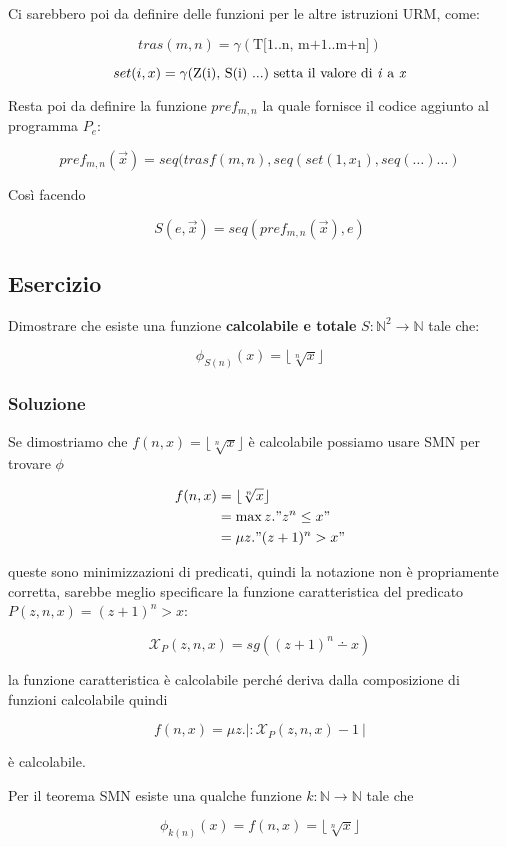 Ci sarebbero poi da definire delle funzioni per le altre istruzioni URM, come:

$$
tras(m,n) = \gamma(\text{T[1..n, m+1..m+n]})
$$

$$
set(i,x) = \gamma(\text{Z(i), S(i) ...}) \text{ setta il valore di \textit{i} a \textit{x}}
$$

Resta poi da definire la funzione $ pref_{m,n} $ la quale fornisce il codice aggiunto al programma $ P_e $:

$$
pref_{m,n}(\vec{x}) = seq(trasf(m,n), seq( set(1,x_1), seq( \ldots) \ldots )
$$

Così facendo

$$
S(e, \vec{x}) = seq(pref_{m,n}(\vec{x}) ,e )
$$

\subsection{Esercizio}

Dimostrare che esiste una funzione \textbf{calcolabile e totale}  $ S : \mathbb{N}^2 \rightarrow  \mathbb{N} $ tale che:

$$
\phi_{S(n)}(x) = \lfloor\sqrt[n]{x}\rfloor
$$

\subsubsection{Soluzione}


Se dimostriamo che $ f(n,x) =  \lfloor\sqrt[n]{x}\rfloor $ è calcolabile possiamo usare SMN per trovare $ \phi $

\begin{align*}
f(n,x) &= \lfloor\sqrt[n]{x}\rfloor \\
			&= \max z."z^n \leq x" \\
			&= \mu z."(z+1)^n > x" \\
\end{align*}

queste sono minimizzazioni di predicati, quindi la notazione non è propriamente corretta, sarebbe meglio specificare la funzione caratteristica del predicato $ P(z,n,x) = (z+1)^n > x$:

$$
\mathcal{X}_P(z,n,x) = sg((z+1)^n \dotminus x)
$$

la funzione caratteristica è calcolabile perché deriva dalla composizione di funzioni calcolabile quindi

$$
f(n,x) = \mu z.|: \mathcal{X}_P(z,n,x) - 1 \: |
$$

è calcolabile.

Per il teorema SMN esiste una qualche funzione $ k : \mathbb{N} \rightarrow \mathbb{N} $ tale che

$$
\phi_{k(n)}(x) = f(n,x) =  \lfloor\sqrt[n]{x}\rfloor 
$$











